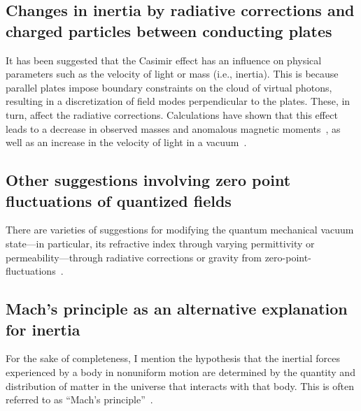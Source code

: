 \subsection{Changes in inertia by radiative corrections and charged particles between conducting plates}

It has been suggested that the Casimir effect has an influence on physical parameters such as the velocity of light or mass (i.e., inertia). This is because parallel plates impose boundary constraints on the cloud of virtual photons, resulting in a discretization of field modes perpendicular to the plates. These, in turn, affect the radiative corrections. Calculations have shown that this effect leads to a decrease in observed masses and anomalous magnetic moments~\cite{1995-mass,PhysRevD.34.1429}, as well as an increase in the velocity of light in a vacuum~\cite{scharnhorst,0305-4470-26-8-024,Scharnhorst-1998,milonni,Chiao:02}.


\subsection{Other suggestions involving zero point fluctuations of quantized fields}

There are varieties of suggestions for modifying the quantum mechanical vacuum state---in particular, its refractive index through varying permittivity or permeability---through radiative corrections or gravity from zero-point-fluctuations~\cite{dirac-aether, Sakharov_2000, Rueda_1998, Puthoff_1989, Haisch_2001, Bombelli_2005, Davis_2006, Robertson_2008}.

\subsection{Mach's principle as an alternative explanation for inertia}

For the sake of completeness, I mention the hypothesis that the inertial forces experienced by a body in nonuniform motion are determined by the quantity and distribution of matter in the universe that interacts with that body. This is often referred to as ``Mach's principle''~\cite{Barbour1995Aug}.
